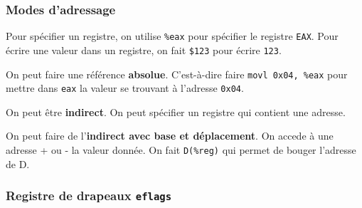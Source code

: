 \subsubsection{Modes d'adressage}\label{modes-dadressage}

Pour spécifier un registre, on utilise \texttt{\%eax} pour spécifier le
registre \texttt{EAX}. Pour écrire une valeur dans un registre, on fait
\texttt{\$123} pour écrire \texttt{123}.

\begin{Shaded}
\begin{Highlighting}[]
\end{Highlighting}
\end{Shaded}

On peut faire une référence \textbf{absolue}. C'est-à-dire faire
\texttt{movl\ 0x04,\ \%eax} pour mettre dans \texttt{eax} la valeur se
trouvant à l'adresse \texttt{0x04}.

On peut être \textbf{indirect}. On peut spécifier un registre qui
contient une adresse.

\begin{Shaded}
\begin{Highlighting}[]
\end{Highlighting}
\end{Shaded}

On peut faire de l'\textbf{indirect avec base et déplacement}. On accede
à une adresse + ou - la valeur donnée. On fait \texttt{D(\%reg)} qui
permet de bouger l'adresse de D.

\begin{Shaded}
\begin{Highlighting}[]
\end{Highlighting}
\end{Shaded}

\subsubsection{\texorpdfstring{Registre de drapeaux
\texttt{eflags}}{Registre de drapeaux eflags}}\label{registre-de-drapeaux-eflags}

